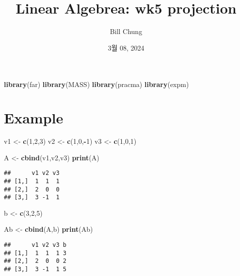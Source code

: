 \documentclass[
]{article}
\title{Linear Algebrea: wk5 projection}
\author{Bill Chung}
\date{3월 08, 2024}
\newenvironment{Shaded}{\begin{snugshade}}{\end{snugshade}}
\newcommand{\DecValTok}[1]{\textcolor[rgb]{0.00,0.00,0.81}{#1}}
\newcommand{\FunctionTok}[1]{\textcolor[rgb]{0.13,0.29,0.53}{\textbf{#1}}}
\newcommand{\NormalTok}[1]{#1}
\newcommand{\OtherTok}[1]{\textcolor[rgb]{0.56,0.35,0.01}{#1}}
\newcommand{\SpecialCharTok}[1]{\textcolor[rgb]{0.81,0.36,0.00}{\textbf{#1}}}
\begin{document}
\maketitle

\begin{Shaded}
\begin{Highlighting}[]
\FunctionTok{library}\NormalTok{(far)}
\FunctionTok{library}\NormalTok{(MASS)}
\FunctionTok{library}\NormalTok{(pracma)}
\FunctionTok{library}\NormalTok{(expm)}
\end{Highlighting}
\end{Shaded}

\hypertarget{example}{%
\section{Example}\label{example}}

\begin{Shaded}
\begin{Highlighting}[]
\NormalTok{v1 }\OtherTok{\textless{}{-}} \FunctionTok{c}\NormalTok{(}\DecValTok{1}\NormalTok{,}\DecValTok{2}\NormalTok{,}\DecValTok{3}\NormalTok{)}
\NormalTok{v2 }\OtherTok{\textless{}{-}} \FunctionTok{c}\NormalTok{(}\DecValTok{1}\NormalTok{,}\DecValTok{0}\NormalTok{,}\SpecialCharTok{{-}}\DecValTok{1}\NormalTok{)}
\NormalTok{v3 }\OtherTok{\textless{}{-}} \FunctionTok{c}\NormalTok{(}\DecValTok{1}\NormalTok{,}\DecValTok{0}\NormalTok{,}\DecValTok{1}\NormalTok{)}

\NormalTok{A }\OtherTok{\textless{}{-}} \FunctionTok{cbind}\NormalTok{(v1,v2,v3)}
\FunctionTok{print}\NormalTok{(A)}
\end{Highlighting}
\end{Shaded}

\begin{verbatim}
##      v1 v2 v3
## [1,]  1  1  1
## [2,]  2  0  0
## [3,]  3 -1  1
\end{verbatim}

\begin{Shaded}
\begin{Highlighting}[]
\NormalTok{b }\OtherTok{\textless{}{-}} \FunctionTok{c}\NormalTok{(}\DecValTok{3}\NormalTok{,}\DecValTok{2}\NormalTok{,}\DecValTok{5}\NormalTok{)}

\NormalTok{Ab }\OtherTok{\textless{}{-}} \FunctionTok{cbind}\NormalTok{(A,b)}
\FunctionTok{print}\NormalTok{(Ab)  }
\end{Highlighting}
\end{Shaded}

\begin{verbatim}
##      v1 v2 v3 b
## [1,]  1  1  1 3
## [2,]  2  0  0 2
## [3,]  3 -1  1 5
\end{verbatim}
\end{document}
